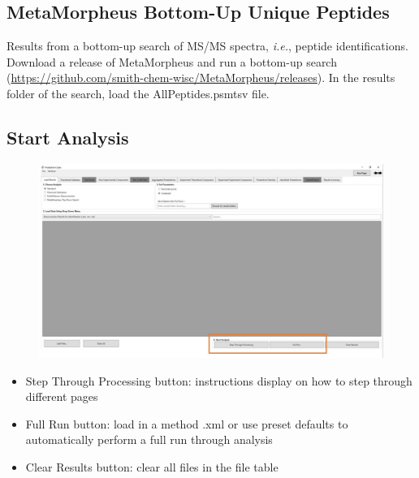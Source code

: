 \subsection{MetaMorpheus Bottom-Up Unique Peptides}

Results from a bottom-up search of MS/MS spectra, \textit{i.e.}, peptide identifications.\supercite{Schaffer2020} Download a release of MetaMorpheus and run a bottom-up search (\url{https://github.com/smith-chem-wisc/MetaMorpheus/releases}). In the results folder of the search, load the AllPeptides.psmtsv file. 

\pagebreak
\subsection{Start Analysis}

\begin{figure}[h]
\centering
\includegraphics[scale=0.4]{figures/load_results_4.jpg}
\end{figure}

\begin{itemize}
	\item Step Through Processing button: instructions display on how to step through different pages
	\item Full Run button: load in a method .xml or use preset defaults to automatically perform a full run through analysis
	\item Clear Results button: clear all files in the file table
\end{itemize}
